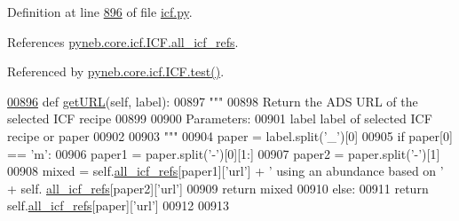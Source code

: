 Definition at line \hyperlink{icf_8py_source_l00896}{896} of file \hyperlink{icf_8py_source}{icf.\+py}.



References \hyperlink{icf_8py_source_l00680}{pyneb.\+core.\+icf.\+I\+C\+F.\+all\+\_\+icf\+\_\+refs}.



Referenced by \hyperlink{icf_8py_source_l01114}{pyneb.\+core.\+icf.\+I\+C\+F.\+test()}.


\begin{DoxyCode}
\hypertarget{classpyneb_1_1core_1_1icf_1_1_i_c_f_l00896}{}\hyperlink{classpyneb_1_1core_1_1icf_1_1_i_c_f_a838ffba1ba395f7039a8f80eab6c46d2}{00896}     \textcolor{keyword}{def }\hyperlink{classpyneb_1_1core_1_1icf_1_1_i_c_f_a838ffba1ba395f7039a8f80eab6c46d2}{getURL}(self, label): 
00897         \textcolor{stringliteral}{""" }
00898 \textcolor{stringliteral}{        Return the ADS URL of the selected ICF recipe }
00899 \textcolor{stringliteral}{        }
00900 \textcolor{stringliteral}{        Parameters:}
00901 \textcolor{stringliteral}{            label    label of selected ICF recipe or paper}
00902 \textcolor{stringliteral}{}
00903 \textcolor{stringliteral}{        """}        
00904         paper = label.split(\textcolor{stringliteral}{'\_'})[0]
00905         \textcolor{keywordflow}{if} paper[0] == \textcolor{stringliteral}{'m'}:
00906             paper1 = paper.split(\textcolor{stringliteral}{'-'})[0][1:]
00907             paper2 = paper.split(\textcolor{stringliteral}{'-'})[1]
00908             mixed = self.\hyperlink{classpyneb_1_1core_1_1icf_1_1_i_c_f_a9777abc7cc843cd5c4d8c5810c1b2ed1}{all\_icf\_refs}[paper1][\textcolor{stringliteral}{'url'}] + \textcolor{stringliteral}{' using an abundance based on '} + self.
      \hyperlink{classpyneb_1_1core_1_1icf_1_1_i_c_f_a9777abc7cc843cd5c4d8c5810c1b2ed1}{all\_icf\_refs}[paper2][\textcolor{stringliteral}{'url'}]
00909             \textcolor{keywordflow}{return} mixed
00910         \textcolor{keywordflow}{else}:
00911             \textcolor{keywordflow}{return} self.\hyperlink{classpyneb_1_1core_1_1icf_1_1_i_c_f_a9777abc7cc843cd5c4d8c5810c1b2ed1}{all\_icf\_refs}[paper][\textcolor{stringliteral}{'url'}]
00912    
00913     
\end{DoxyCode}
\hypertarget{classpyneb_1_1core_1_1icf_1_1_i_c_f_a3b52e8d7dd5bb7a5a667cba328d9af7f}{}

